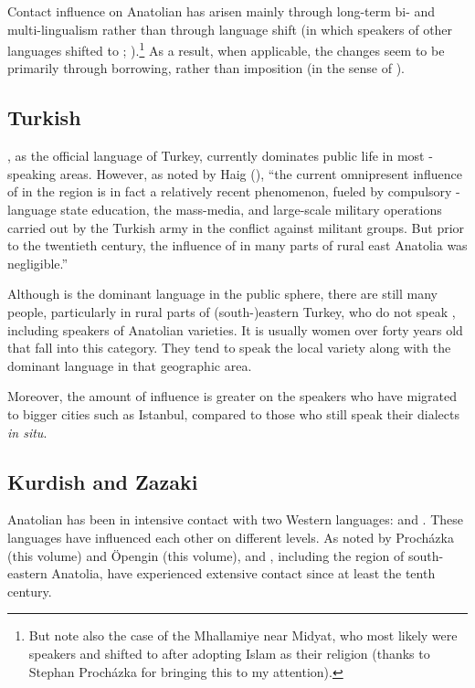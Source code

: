 \documentclass[output=paper]{langsci/langscibook}
\begin{document}
Contact influence on Anatolian  has arisen mainly through long-term bi- and multi-lingualism rather than through {language shift} (in which speakers of other languages shifted to ; \citealt{Thomason2001}).\footnote{But note also the case of the Mhallamiye near Midyat, who most likely were  speakers and shifted to  after adopting Islam as their religion (thanks to Stephan Procházka for bringing this to my attention).} As a result, when applicable, the changes seem to be primarily through borrowing, rather than {imposition} (in the sense of \citealt{VanCoetsem1988,VanCoetsem2000}).


\subsection{Turkish}
, as the official language of Turkey, currently dominates public life in most -speaking areas. However, as noted by Haig (\citeyear[14]{Haig2014}), ``the current omnipresent influence of  in the region is in fact a relatively recent phenomenon,
fueled by compulsory -language state education, the mass-media, and large-scale military operations carried out by the Turkish army in the conflict against militant  groups. But prior to the twentieth century, the influence of  in many parts of rural east {Anatolia} was negligible.''

Although  is the dominant language in the public sphere, there are still many people, particularly in rural parts of (south-)eastern Turkey, who do not speak , including speakers of Anatolian  varieties. It is usually women over forty years old that fall into this category. They tend to speak the local  variety along with the dominant language in that geographic area.


Moreover, the amount of  influence is greater on the  speakers who have migrated to bigger cities such as Istanbul, compared to those who still speak their dialects \textit{in situ}.

\subsection{Kurdish and Zazaki}
Anatolian  has been in {intensive} contact with two Western  languages:   and . These languages have influenced each other on different levels. As noted by Proch\'{a}zka (this volume) and Öpengin (this volume),  and , including the region of south-eastern {Anatolia}, have experienced extensive contact since at least the tenth century.
\end{document}
